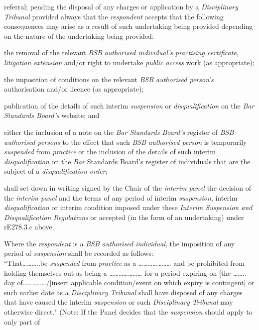 referral;\lr\la\ln
pending the disposal of any charges or application by
a \emph{Disciplinary Tribunal} provided always that
the \emph{respondent }accepts that the following consequences may arise
as a result of such undertaking being provided depending on the nature
of the undertaking being provided:\item the removal of the relevant \emph{BSB authorised
individual's} \emph{practising certificate}, \emph{litigation
extension} and/or right to undertake \emph{public access} work (as
appropriate);\item the imposition of conditions on the relevant \emph{BSB authorised
person's} authorisation\textbf{ }and/or licence (as appropriate);\item publication of the details of such
interim \emph{suspension} or \emph{disqualification} on the \emph{Bar
Standards Board's} website; and\item either the inclusion of a note on the \emph{Bar Standards
Board's} register of \emph{BSB authorised persons} to the effect that
such \emph{BSB authorised person} is
temporarily \emph{suspended} from \emph{practice} or the inclusion of
the details of such interim \emph{disqualification} on
the \emph{Bar }Standards Board's register of individuals that are the
subject of a \emph{disqualification order};\item shall set down in writing signed by the Chair of the \emph{interim
panel} the decision of the \emph{interim panel} and the terms of any
period of interim \emph{suspension}, interim \emph{disqualification} or
interim condition imposed under these \emph{Interim Suspension and
Disqualification Regulations} or accepted (in the form of an
undertaking) under rE278.3.c above.\al
\item  Where the \emph{respondent} is a \emph{BSB authorised individual},
the imposition of any period of \emph{suspension} shall be recorded as
follows:\\
``That\ldots\ldots\ldots..be \emph{suspended} from \emph{practice} as a
\ldots\ldots\ldots\ldots\ldots\ldots\ldots{} and be prohibited from
holding themselves out as being a
\ldots\ldots\ldots\ldots\ldots\ldots\ldots{} for a period expiring on
{[}the \ldots\ldots.. day of\ldots\ldots\ldots\ldots\ldots/{[}insert
applicable condition/event on which expiry is contingent{]} or such
earlier date as a \emph{Disciplinary Tribunal} shall have disposed of
any charges that have caused the interim \emph{suspension} or
such \emph{Disciplinary Tribunal} may otherwise direct." (Note: If the
Panel decides that the \emph{suspension} should apply to only part of
